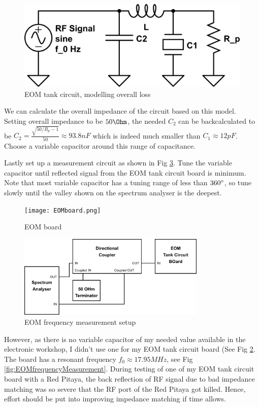 \documentclass[12pt]{report}
\begin{document}
\begin{figure}[H]
    \centering
    \includegraphics[width=.8\textwidth]{eom-tank-cirucuit2.png}
    \caption{EOM tank circuit, modelling overall loss}
    \label{fig:eom-tank-cirucuit2}
\end{figure}

We can calculate the overall impedance of the circuit based on this model. Setting overall impedance to be $50\Ohm$, the needed $C_2$ can be backcalculated to be $C_2 = \frac{\sqrt{50/R_p -1}}{50} \approx 93.8 nF$ which is indeed much smaller than $C_1 \approx 12 pF$. Choose a variable capacitor around this range of capacitance. 
\par
Lastly set up a measurement circuit as shown in Fig \ref{fig:eom-freq-measurement-setup.png}. Tune the variable capacitor until reflected signal from the EOM tank circuit board is minimum. Note that most variable capacitor has a tuning range of less than $360\degree$, so tune slowly until the valley shown on the spectrum analyser is the deepest. 

\begin{figure}[H]
    \centering
    \texttt{[image: EOMboard.png]}
    \caption{EOM board}
    \label{fig:EOMboard}
\end{figure}

\begin{figure}[H]
    \centering
    \includegraphics[width=0.8\textwidth]{eom-freq-measurement-setup.png}
    \caption{EOM frequency measurement setup}
    \label{fig:eom-freq-measurement-setup.png}
\end{figure}

However, as there is no variable capacitor of my needed value available in the electronic workshop, I didn't use one for my EOM tank circuit board (See Fig \ref{fig:EOMboard}. The board has a resonant frequency $f_0 \approx 17.95 MHz$, see Fig \ref{fig:EOMfrequencyMeasurement}. During testing of one of my EOM tank circuit board with a Red Pitaya, the back reflection of RF signal due to bad impedance matching was so severe that the RF port of the Red Pitaya got killed. Hence, effort should be put into improving impedance matching if time allows. 
\end{document}
